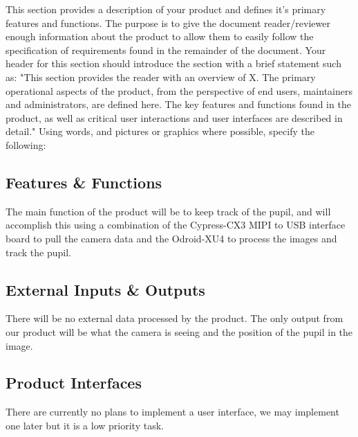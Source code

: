 This section provides a description of your product and defines it's primary features and functions. The purpose is to give the document reader/reviewer enough information about the product to allow them to easily follow the specification of requirements found in the remainder of the document. Your header for this section should introduce the section with a brief statement such as: "This section provides the reader with an overview of X. The primary operational aspects of the product, from the perspective of end users, maintainers and administrators, are defined here. The key features and functions found in the product, as well as critical user interactions and user interfaces are described in detail." Using words, and pictures or graphics where possible, specify the following:

\subsection{Features \& Functions}
The main function of the product will be to keep track of the pupil, and will accomplish this using a combination of the Cypress-CX3 MIPI to USB interface board to pull the camera data and the Odroid-XU4 to process the images and track the pupil.


\subsection{External Inputs \& Outputs}
There will be no external data processed by the product.
The only output from our product will be what the camera is seeing and the position of the pupil in the image.

\subsection{Product Interfaces}
There are currently no plans to implement a user interface, we may implement one later but it is a low priority task.
